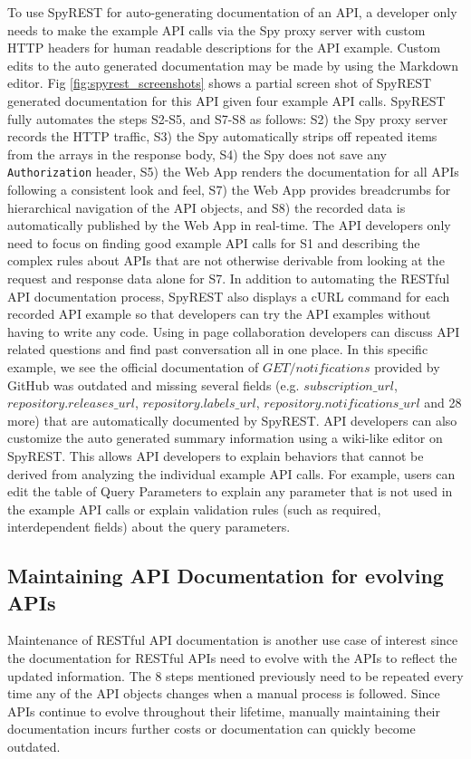 \documentclass[conference]{IEEEtran}
\begin{document}
To use SpyREST for auto-generating documentation of an API, a developer only needs to make the example API calls via the Spy proxy server with custom HTTP headers for human readable descriptions for the API example. Custom edits to the auto generated documentation may be made by using the Markdown editor. Fig \ref{fig:spyrest_screenshots} shows a partial screen shot of SpyREST generated documentation for this API given four example API calls. SpyREST fully automates the steps S2-S5, and S7-S8 as follows: S2) the Spy proxy server records the HTTP traffic, S3) the Spy automatically strips off repeated items from the arrays in the response body, S4) the Spy does not save any \texttt{Authorization} header, S5) the Web App renders the documentation for all APIs following a consistent look and feel, S7) the Web App provides breadcrumbs for hierarchical navigation of the API objects, and S8) the recorded data is automatically published by the Web App in real-time. The API developers only need to focus on finding good example API calls for S1 and describing the complex rules about APIs that are not otherwise derivable from looking at the request and response data alone for S7. In addition to automating the RESTful API documentation process, SpyREST also displays a cURL command for each recorded API example so that developers can try the API examples without having to write any code. Using in page collaboration developers can discuss API related questions and find past conversation all in one place. In this specific example, we see the official documentation of $GET /notifications$ provided by GitHub was outdated and missing several fields (e.g. $subscription\_url$, $repository.releases\_url$, $repository.labels\_url$, $repository.notifications\_url$ and 28 more) that are automatically documented by SpyREST. API developers can also customize the auto generated summary information using a wiki-like editor on SpyREST. This allows API developers to explain behaviors that cannot be derived from analyzing the individual example API calls. For example, users can edit the table of Query Parameters to explain any parameter that is not used in the example API calls or explain validation rules (such as required, interdependent fields) about the query parameters.

\subsection{Maintaining API Documentation for evolving APIs} %
Maintenance of RESTful API documentation is another use case of interest since the documentation for RESTful APIs need to evolve with the APIs to reflect the updated information. The 8 steps mentioned previously need to be repeated every time any of the API objects changes when a manual process is followed. Since APIs continue to evolve throughout their lifetime, manually maintaining their documentation incurs further costs or documentation can quickly become outdated.
\end{document}
